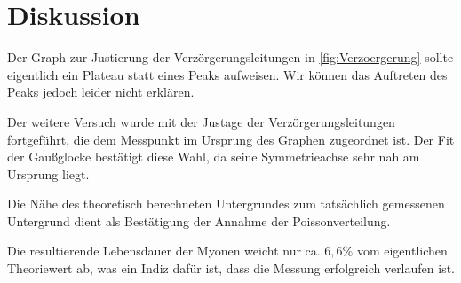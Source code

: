 \newpage
\section{Diskussion}
    Der Graph zur Justierung der Verzörgerungsleitungen in \autoref{fig:Verzoergerung} sollte eigentlich ein Plateau statt eines Peaks aufweisen. Wir können das Auftreten des Peaks jedoch leider nicht erklären.

    Der weitere Versuch wurde mit der Justage der Verzörgerungsleitungen fortgeführt, die dem Messpunkt im Ursprung des Graphen zugeordnet ist. Der Fit der Gaußglocke bestätigt diese Wahl, da seine Symmetrieachse sehr nah am Ursprung liegt.

    Die Nähe des theoretisch berechneten Untergrundes zum tatsächlich gemessenen Untergrund dient als Bestätigung der Annahme der Poissonverteilung.

    Die resultierende Lebensdauer der Myonen weicht nur ca. $6,6 \%$ vom eigentlichen Theoriewert ab, was ein Indiz dafür ist, dass die Messung erfolgreich verlaufen ist.

    


